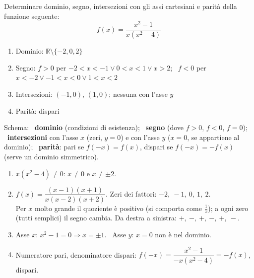 \begin{question}[ID=1.5, subtitle={Studio di una funzione razionale con più fattori}, difficulty=difficile, tags={funzioni, studio di funzione}]
Determinare dominio, segno, intersezioni con gli assi cartesiani e parità della funzione seguente:
\begin{equation*}
    f(x)=\dfrac{x^2-1}{x(x^2-4)}
\end{equation*}
\begin{solution}
\begin{enumerate}
    \item Dominio: $\mathbb{R}\setminus\{-2,0,2\}$
    \item Segno: $f>0$ per $-2<x<-1\vee0<x<1\vee x>2$; \ $f<0$ per $x<-2\vee-1<x<0\vee1<x<2$
    \item Intersezioni: $(-1,0)$, $(1,0)$; nessuna con l'asse $y$
    \item Parità: dispari
\end{enumerate}
\end{solution}
\begin{explanation}
Schema: \ \textbf{dominio} (condizioni di esistenza); \ \textbf{segno} (dove $f>0$, $f<0$, $f=0$); \ \textbf{intersezioni} con l'asse $x$ (zeri, $y=0$) e con l'asse $y$ ($x=0$, se appartiene al dominio); \ \textbf{parità}: pari se $f(-x)=f(x)$, dispari se $f(-x)=-f(x)$ (serve un dominio simmetrico).
\begin{enumerate}
    \item $x(x^2-4)\neq0$: $x\neq0$ e $x\neq\pm2$.
    \item $f(x)=\dfrac{(x-1)(x+1)}{x(x-2)(x+2)}$. Zeri dei fattori: $-2,\ -1,\ 0,\ 1,\ 2$. \\
    Per $x$ molto grande il quoziente è positivo (si comporta come $\tfrac1x$); a ogni zero (tutti semplici) il segno cambia. Da destra a sinistra: $+,\ -,\ +,\ -,\ +,\ -$.
    \item Asse $x$: $x^2-1=0 \Rightarrow x=\pm1$. \ Asse $y$: $x=0$ non è nel dominio.
    \item Numeratore pari, denominatore dispari: $f(-x)=\dfrac{x^2-1}{-x(x^2-4)}=-f(x)$, dispari.
\end{enumerate}
\end{explanation}
\end{question}



